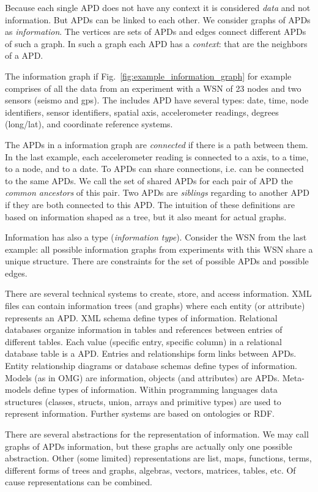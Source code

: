 Because each single APD does not have any context it is considered \emph{data} and not information. But APDs can be linked to each other. We consider graphs of APDs as \emph{information}. The vertices are sets of APDs and edges connect different APDs of such a graph. In such a graph each APD has a \emph{context}: that are the neighbors of a APD.

The information graph if Fig.~\ref{fig:example_information_graph} for example comprises of all the data from an experiment with a WSN of 23 nodes and two sensors (seismo and gps). The includes APD have several types: date, time, node identifiers, sensor identifiers, spatial axis, accelerometer readings, degrees (long/lat), and coordinate reference systems. 

The APDs in a information graph are \emph{connected} if there is a path between them. In the last example, each accelerometer reading is connected to a axis, to a time, to a node, and to a date. To APDs can share connections, i.e. can be connected to the same APDs. We call the set of shared APDs for each pair of APD the \emph{common ancestors} of this pair. Two APDs are \emph{siblings} regarding to another APD if they are both connected to this APD. The intuition of these definitions are based on information shaped as a tree, but it also meant for actual graphs. 

Information has also a type (\emph{information type}). Consider the WSN from the last example: all possible information graphs from experiments with this WSN share a unique structure. There are constraints for the set of possible APDs and possible edges.

There are several technical systems to create, store, and access information. XML files can contain information trees (and graphs) where each entity (or attribute) represents an APD. XML schema define types of information. Relational databases organize information in tables and references between entries of different tables. Each value (specific entry, specific column) in a relational database table is a APD. Entries and relationships form links between APDs. Entity relationship diagrams or database schemas define types of information. Models (as in OMG) are information, objects (and attributes) are APDs. Meta-models define types of information. Within programming languages data structures (classes, structs, union, arrays and primitive types) are used to represent information. Further systems are based on ontologies or RDF.

There are several abstractions for the representation of information. We may call graphs of APDs information, but these graphs are actually only one possible abstraction. Other (some limited) representations are list, maps, functions, terms, different forms of trees and graphs, algebras, vectors, matrices, tables, etc. Of cause representations can be combined. 

